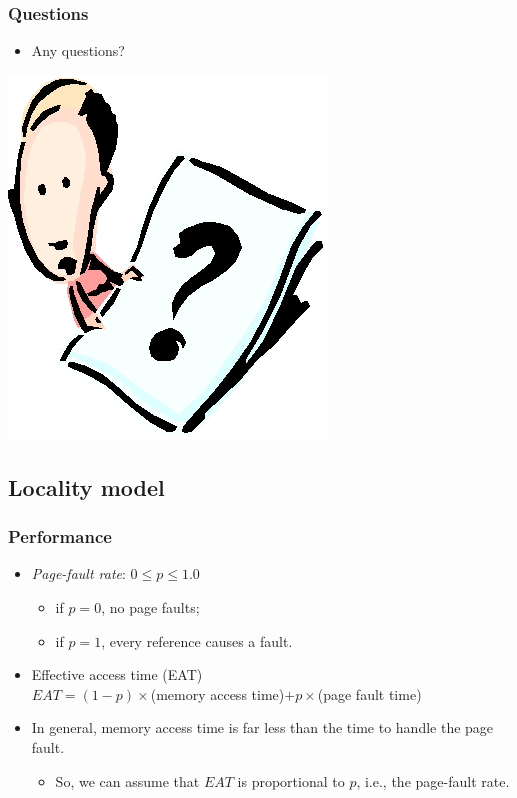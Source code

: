 \documentclass[CJKutf8,xcolor=pdftex,dvipsnames,table]{beamer}
\begin{document}
\begin{CJK*}{UTF8}{song}
  \begin{frame}
    \frametitle{Questions}
    \begin{itemize}
    \item{Any questions?}
    \end{itemize}
    \begin{center}
      \includegraphics[scale=.5]{question}
    \end{center}
  \end{frame}
 
  \subsection{Locality model}
  
  \begin{frame}
    \frametitle{Performance} \pause
    \begin{itemize}
    \item{\emph{Page-fault rate}: $0\leq p \leq 1.0$} \pause
      \begin{itemize}
      \item{if $p=0$, no page faults;} \pause
      \item{if $p=1$, every reference causes a fault.} \pause
      \end{itemize}
    \item{Effective access time (EAT)\\$EAT=(1-p)\times$(memory  access time)$ + p \times $(page fault time)} \pause
    \item{In general, memory access time is far less than the time to handle the page fault.} \pause
      \begin{itemize}
      \item{So, we can assume that $EAT$ is proportional to $p$, i.e., the page-fault rate.}
      \end{itemize}
    \end{itemize}
  \end{frame}
  

\end{CJK*}
\end{document}
